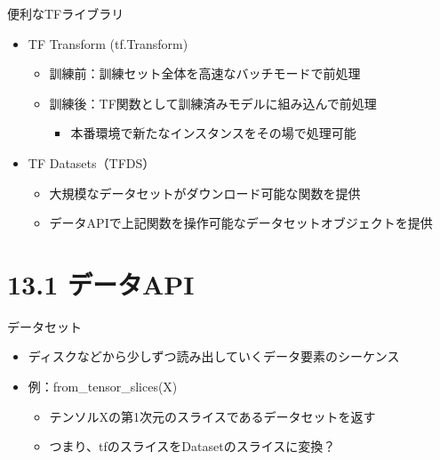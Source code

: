 \documentclass[aspectratio=169, dvipdfmx, 14pt, xcolor={svgnames,dvipsnames}, t]{beamer}
\begin{document}
\begin{frame}{便利なTFライブラリ}

  \begin{itemize}
    \tightlist
    \item
          TF Transform (tf.Transform)

          \begin{itemize}
            \tightlist
            \item
                  訓練前：訓練セット全体を高速なバッチモードで前処理
            \item
                  訓練後：TF関数として訓練済みモデルに組み込んで前処理

                  \begin{itemize}
                    \tightlist
                    \item
                          本番環境で新たなインスタンスをその場で処理可能
                  \end{itemize}
          \end{itemize}
    \item
          TF Datasets（TFDS）

          \begin{itemize}
            \tightlist
            \item
                  大規模なデータセットがダウンロード可能な関数を提供
            \item
                  データAPIで上記関数を操作可能なデータセットオブジェクトを提供
          \end{itemize}
  \end{itemize}

\end{frame}


\hypertarget{ux30c7ux30fcux30bfapi}{%
  \section{13.1 データAPI}\label{ux30c7ux30fcux30bfapi}}


\begin{frame}{データセット}

  \begin{itemize}
    \tightlist
    \item
          ディスクなどから少しずつ読み出していくデータ要素のシーケンス
    \item
          例：from\_tensor\_slices(X)

          \begin{itemize}
            \tightlist
            \item
                  テンソルXの第1次元のスライスであるデータセットを返す
            \item
                  つまり、tfのスライスをDatasetのスライスに変換？
          \end{itemize}
  \end{itemize}

\end{frame}
\end{document}
